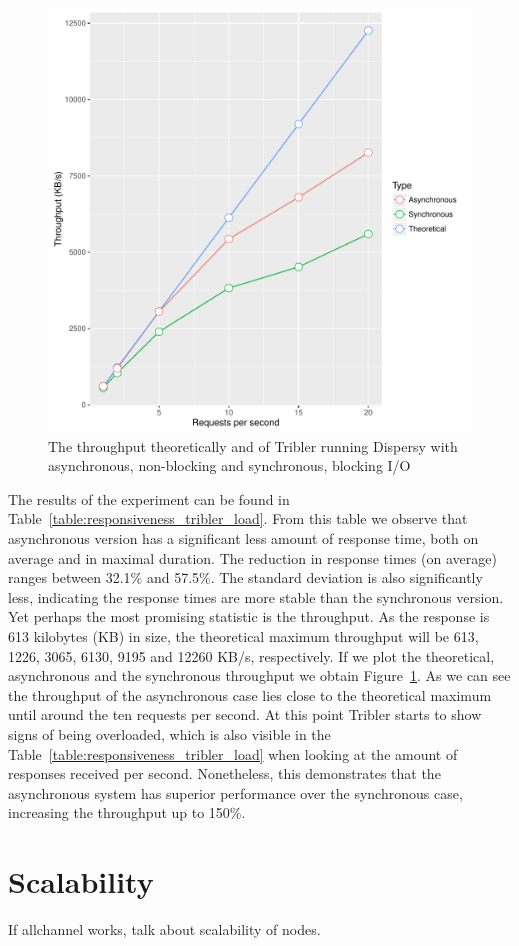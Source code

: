 \begin{figure}[!h]
	\centering
	\includegraphics[width=\linewidth]{experimentation/images/throughput_requests.pdf}
	\caption{The throughput theoretically and of Tribler running Dispersy with asynchronous, non-blocking and synchronous, blocking I/O }
	\label{fig:throughput_requests}
\end{figure} 

The results of the experiment can be found in Table~\ref{table:responsiveness_tribler_load}.
From this table we observe that asynchronous version has a significant less amount of response time, both on average and in maximal duration.
The reduction in response times (on average) ranges between 32.1\% and 57.5\%.
The standard deviation is also significantly less, indicating the response times are more stable than the synchronous version.
Yet perhaps the most promising statistic is the throughput.
As the response is 613 kilobytes (KB) in size, the theoretical maximum throughput will be 613, 1226, 3065, 6130, 9195 and 12260 KB/s, respectively.
If we plot the theoretical, asynchronous and the synchronous throughput we obtain Figure~\ref{fig:throughput_requests}.
As we can see the throughput of the asynchronous case lies close to the theoretical maximum until around the ten requests per second.
At this point Tribler starts to show signs of being overloaded, which is also visible in the Table~\ref{table:responsiveness_tribler_load} when looking at the amount of responses received per second.
Nonetheless, this demonstrates that the asynchronous system has superior performance over the synchronous case, increasing the throughput up to 150\%.


\section{Scalability}

If allchannel works, talk about scalability of nodes. 


